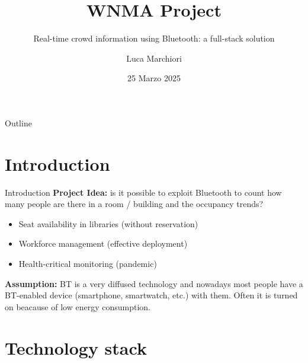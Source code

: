 \documentclass{beamer}
\title{WNMA Project}
\subtitle{Real-time crowd information using Bluetooth: a full-stack solution}
\author{Luca Marchiori}
\date{25 Marzo 2025}
\begin{document}
\maketitle

\begin{frame}{Outline}
	\tableofcontents
\end{frame}


\section{Introduction}

\begin{frame}{Introduction}
	\textbf{Project Idea:} is it possible to exploit Bluetooth to count how many people are there in a room / building and the occupancy trends?
	\begin{itemize}
		\item Seat availability in libraries (without reservation)\vspace{.5em}
		\item Workforce management (effective deployment)\vspace{.5em}
		\item Health-critical monitoring (pandemic)\vspace{.5em}
	\end{itemize}

	\textbf{Assumption:} BT is a very diffused technology and nowadays most people have a BT-enabled device (smartphone, smartwatch, etc.) with them. Often it is turned on beacause of low energy consumption.

\end{frame}

\section{Technology stack}
\end{document}
